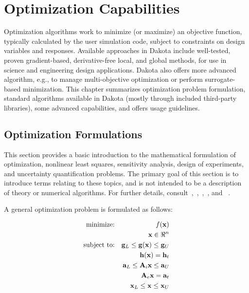 \chapter{Optimization Capabilities}\label{opt}

Optimization algorithms work to minimize (or maximize) an objective
function, typically calculated by the user simulation code, subject to
constraints on design variables and responses. Available approaches
in Dakota include well-tested, proven gradient-based, derivative-free
local, and global methods, for use in science and engineering design
applications. Dakota also offers more advanced algorithm, e.g., to
manage multi-objective optimization or perform surrogate-based minimization.
This chapter summarizes optimization problem formulation, standard
algorithms available in Dakota (mostly through included third-party
libraries), some advanced capabilities, and offers usage guidelines.

\section{Optimization Formulations}\label{opt:formulations}

This section provides a basic introduction to the mathematical
formulation of optimization, nonlinear least squares, sensitivity
analysis, design of experiments, and uncertainty quantification
problems. The primary goal of this section is to introduce terms
relating to these topics, and is not intended to be a description of
theory or numerical algorithms. For further details,
consult~\cite{Aro89},~\cite{Gil81},~\cite{Haf92},~\cite{Noc99}, and
~\cite{Van84}.

A general optimization problem is formulated as follows:

\begin{eqnarray}
  \hbox{minimize:} & & f(\mathbf{x})\nonumber\\
  & & \mathbf{x} \in \Re^{n}\nonumber\\
  \hbox{subject to:} & &
  \mathbf{g}_{L} \leq \mathbf{g(x)} \leq \mathbf{g}_U\nonumber\\
  & & \mathbf{h(x)}=\mathbf{h}_{t}\label{opt:equation01}\\
  & & \mathbf{a}_{L} \leq \mathbf{A}_i\mathbf{x} \leq
  \mathbf{a}_U\nonumber\\
  & & \mathbf{A}_{e}\mathbf{x}=\mathbf{a}_{t}\nonumber\\
  & & \mathbf{x}_{L} \leq \mathbf{x} \leq \mathbf{x}_U\nonumber
\end{eqnarray}

